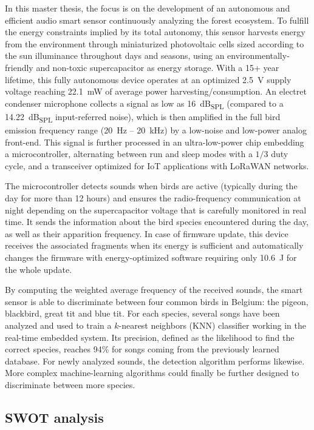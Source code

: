 \documentclass{EPL-master-thesis-covers-EN}
\begin{document}
In this master thesis, the focus is on the development of an autonomous and efficient audio smart sensor continuously analyzing the forest ecosystem. To fulfill the energy constraints implied by its total autonomy, this sensor harvests energy from the environment through miniaturized photovoltaic cells sized according to the sun illuminance throughout days and seasons, using an environmentally-friendly and non-toxic supercapacitor as energy storage.
With a 15+ year lifetime, this fully autonomous device operates at an optimized \SI{2.5}{V} supply voltage reaching \SI{22.1}{mW} of average power harvesting/consumption. An electret condenser microphone collects a signal as low as \SI{16}{dB_{SPL}} (compared to a \SI{14.22}{dB_{SPL}} input-referred noise), which is then amplified in the full bird emission frequency range (\SI{20}{Hz} -- \SI{20}{kHz}) by a low-noise and low-power analog front-end. This signal is further processed in an ultra-low-power chip embedding a microcontroller, alternating between run and sleep modes with a $1/3$ duty cycle, and a transceiver optimized for IoT applications with LoRaWAN networks. 

The microcontroller detects sounds when birds are active (typically during the day for more than 12 hours) and ensures the radio-frequency communication at night depending on the supercapacitor voltage that is carefully monitored in real time. It sends the information about the bird species encountered during the day, as well as their apparition frequency. In case of firmware update, this device receives the associated fragments when its energy is sufficient and automatically changes the firmware with energy-optimized software requiring only \SI{10.6}{J} for the whole update.

By computing the weighted average frequency of the received sounds, the smart sensor is able to discriminate between four common birds in Belgium: the pigeon, blackbird, great tit and blue tit. For each species, several songs have been analyzed and used to train a $k$-nearest neighbors (KNN) classifier working in the real-time embedded system. Its precision, defined as the likelihood to find the correct species, reaches 94\% for songs coming from the previously learned database. For newly analyzed sounds, the detection algorithm performs likewise. More complex machine-learning algorithms could finally be further designed to discriminate between more species.


\subsection*{SWOT analysis}
\end{document}
